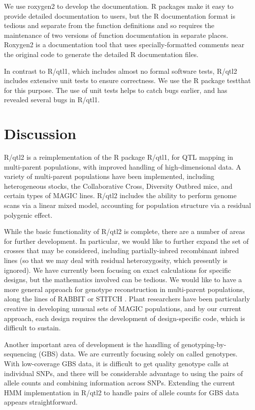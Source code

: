 \documentclass[12pt,letterpaper]{article}
\begin{document}
We use roxygen2 \citep{roxygen2} to develop the documentation. R
packages make it easy to provide detailed documentation to users, but
the R documentation format is tedious and separate from the function
definitions and so requires the maintenance of two versions of
function documentation in separate places. Roxygen2 is a documentation
tool that uses specially-formatted comments near the original code to
generate the detailed R documentation files.

In contrast to R/qtl1, which includes almost no formal software tests,
R/qtl2 includes extensive unit tests to ensure correctness. We use the
R package testthat \citep{testthat} for this purpose. The use of unit
tests helps to catch bugs earlier, and has revealed several bugs in
R/qtl1.




\clearpage
\section*{Discussion}

R/qtl2 is a reimplementation of the R package R/qtl1, for QTL mapping
in multi-parent populations, with improved handling of
high-dimensional data. A variety of multi-parent populations have been
implemented, including heterogeneous stocks, the Collaborative Cross,
Diversity Outbred mice, and certain types of MAGIC lines. R/qtl2
includes the ability to perform genome scans via a linear mixed model,
accounting for population structure via a residual polygenic effect.

While the basic functionality of R/qtl2 is complete, there are a
number of areas for further development. In particular, we would like
to further expand the set of crosses that may be considered, including
partially-inbred recombinant inbred lines (so that we may deal with
residual heterozygosity, which presently is ignored). We have currently
been focusing on exact calculations for specific designs, but the
mathematics involved can be tedious. We would like to have a more
general approach for genotype reconstruction in multi-parent
populations, along the lines of RABBIT \citep{zheng2015} or STITCH
\citep{davies2016}. Plant researchers have been particularly creative
in developing unusual sets of MAGIC populations, and by our current
approach, each design requires the development of design-specific
code, which is difficult to sustain.

Another important area of development is the handling of
genotyping-by-sequencing (GBS) data. We are currently focusing solely
on called genotypes. With low-coverage GBS data, it is difficult
to get quality genotype calls at individual SNPs, and there will be
considerable advantage to using the pairs of allele counts and
combining information across SNPs. Extending the current HMM
implementation in R/qtl2 to handle pairs of allele counts for GBS data
appears straightforward.
\end{document}
